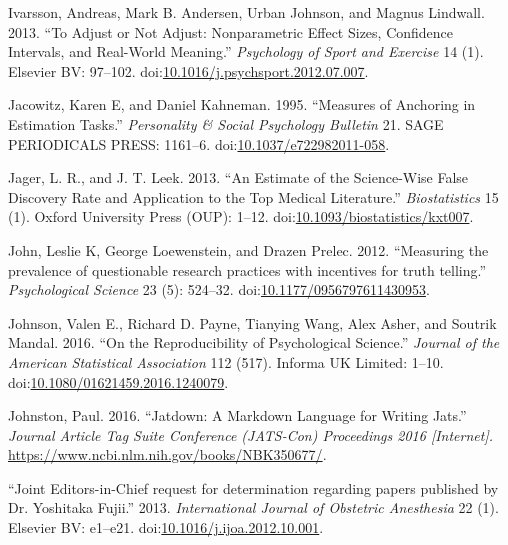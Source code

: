 \documentclass[a5paper]{book}
\begin{document}
\hypertarget{ref-doi:10.1016ux2fj.psychsport.2012.07.007}{}
Ivarsson, Andreas, Mark B. Andersen, Urban Johnson, and Magnus Lindwall.
2013. ``To Adjust or Not Adjust: Nonparametric Effect Sizes, Confidence
Intervals, and Real-World Meaning.'' \emph{Psychology of Sport and
Exercise} 14 (1). Elsevier BV: 97--102.
doi:\href{https://doi.org/10.1016/j.psychsport.2012.07.007}{10.1016/j.psychsport.2012.07.007}.

\hypertarget{ref-doi:10.1037ux2fe722982011-058}{}
Jacowitz, Karen E, and Daniel Kahneman. 1995. ``Measures of Anchoring in
Estimation Tasks.'' \emph{Personality \& Social Psychology Bulletin} 21.
SAGE PERIODICALS PRESS: 1161--6.
doi:\href{https://doi.org/10.1037/e722982011-058}{10.1037/e722982011-058}.

\hypertarget{ref-doi:10.1093ux2fbiostatisticsux2fkxt007}{}
Jager, L. R., and J. T. Leek. 2013. ``An Estimate of the Science-Wise
False Discovery Rate and Application to the Top Medical Literature.''
\emph{Biostatistics} 15 (1). Oxford University Press (OUP): 1--12.
doi:\href{https://doi.org/10.1093/biostatistics/kxt007}{10.1093/biostatistics/kxt007}.

\hypertarget{ref-doi:10.1177ux2f0956797611430953}{}
John, Leslie K, George Loewenstein, and Drazen Prelec. 2012. ``Measuring
the prevalence of questionable research practices with incentives for
truth telling.'' \emph{Psychological Science} 23 (5): 524--32.
doi:\href{https://doi.org/10.1177/0956797611430953}{10.1177/0956797611430953}.

\hypertarget{ref-doi:10.1080ux2f01621459.2016.1240079}{}
Johnson, Valen E., Richard D. Payne, Tianying Wang, Alex Asher, and
Soutrik Mandal. 2016. ``On the Reproducibility of Psychological
Science.'' \emph{Journal of the American Statistical Association} 112
(517). Informa UK Limited: 1--10.
doi:\href{https://doi.org/10.1080/01621459.2016.1240079}{10.1080/01621459.2016.1240079}.

\hypertarget{ref-jatdown}{}
Johnston, Paul. 2016. ``Jatdown: A Markdown Language for Writing Jats.''
\emph{Journal Article Tag Suite Conference (JATS-Con) Proceedings 2016
{[}Internet{]}.} \url{https://www.ncbi.nlm.nih.gov/books/NBK350677/}.

\hypertarget{ref-doi:10.1016ux2fj.ijoa.2012.10.001}{}
``Joint Editors-in-Chief request for determination regarding papers
published by Dr. Yoshitaka Fujii.'' 2013. \emph{International Journal of
Obstetric Anesthesia} 22 (1). Elsevier BV: e1--e21.
doi:\href{https://doi.org/10.1016/j.ijoa.2012.10.001}{10.1016/j.ijoa.2012.10.001}.
\end{document}
